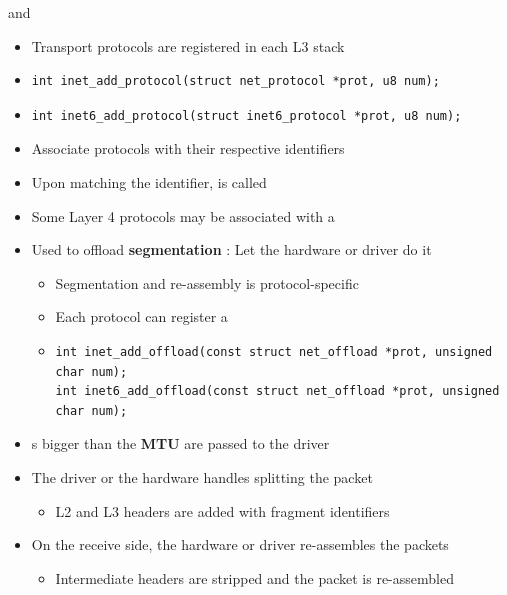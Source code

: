 \begin{frame}[fragile]{ and }
	\begin{itemize}
		\item Transport protocols are registered in each L3 stack
		\item \begin{verbatim}
int inet_add_protocol(struct net_protocol *prot, u8 num);
		\end{verbatim}
		\item \begin{verbatim}
int inet6_add_protocol(struct inet6_protocol *prot, u8 num);
		\end{verbatim}
	\item Associate protocols with their respective identifiers
	\item Upon matching the  identifier,  is called

	\end{itemize}
\end{frame}

\begin{frame}[fragile]{}
	\begin{itemize}
		\item Some Layer 4 protocols may be associated with a 
		\item Used to offload \textbf{segmentation} : Let the hardware or driver do it
			\begin{itemize}
				\item Segmentation and re-assembly is protocol-specific
				\item Each protocol can register a 
				\item \begin{verbatim}
int inet_add_offload(const struct net_offload *prot, unsigned char num);
int inet6_add_offload(const struct net_offload *prot, unsigned char num);
				\end{verbatim}
			\end{itemize}
		\item {}s bigger than the \textbf{MTU} are passed to the driver
		\item The driver or the hardware handles splitting the packet
			\begin{itemize}
				\item L2 and L3 headers are added with fragment identifiers
			\end{itemize}
		\item On the receive side, the hardware or driver re-assembles the packets
			\begin{itemize}
				\item Intermediate headers are stripped and the packet is re-assembled
			\end{itemize}
	\end{itemize}
\end{frame}

